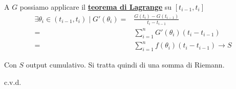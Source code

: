 \documentclass[../dimostrazioni]{subfiles}
\begin{document}
                A \(G\) possiamo applicare il \textbf{\hyperref[teoLagrange]{teorema di Lagrange}} su \([t_{i-1}, t_i]\)
                \begin{align*}
                    \exists  \theta_i \in (t_{i-1}, t_i) \mid G'(\theta_i) =& \frac{G(t_i) - G(t_{i-1})}{t_i - t_{i-1}} \\
                    =& \sum_{i=1}^{n} G'(\theta_i)(t_i - t_{i-1}) \\
                    =& \sum_{i=1}^{n} f(\theta_i)(t_i - t_{i-1}) \longrightarrow S
                \end{align*}

                Con \(S\) output cumulativo. Si tratta quindi di una somma di Riemann.

                
                c.v.d.
    
\end{document}
